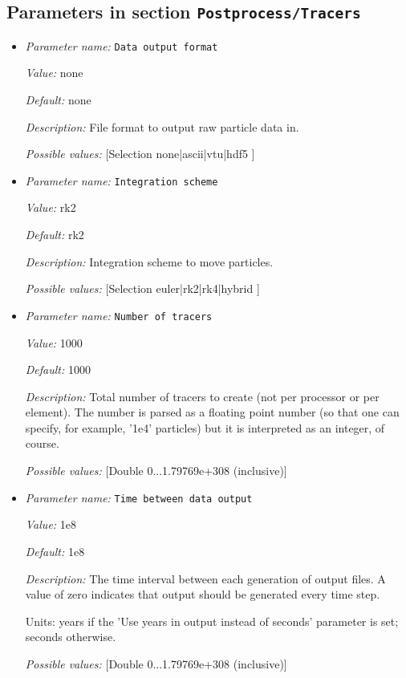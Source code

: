 \subsection{Parameters in section \tt Postprocess/Tracers}
\label{parameters:Postprocess/Tracers}

\begin{itemize}
\item {\it Parameter name:} {\tt Data output format}


{\it Value:} none


{\it Default:} none


{\it Description:} File format to output raw particle data in.


{\it Possible values:} [Selection none|ascii|vtu|hdf5 ]
\item {\it Parameter name:} {\tt Integration scheme}


{\it Value:} rk2


{\it Default:} rk2


{\it Description:} Integration scheme to move particles.


{\it Possible values:} [Selection euler|rk2|rk4|hybrid ]
\item {\it Parameter name:} {\tt Number of tracers}


{\it Value:} 1000


{\it Default:} 1000


{\it Description:} Total number of tracers to create (not per processor or per element). The number is parsed as a floating point number (so that one can specify, for example, '1e4' particles) but it is interpreted as an integer, of course.


{\it Possible values:} [Double 0...1.79769e+308 (inclusive)]
\item {\it Parameter name:} {\tt Time between data output}


{\it Value:} 1e8


{\it Default:} 1e8


{\it Description:} The time interval between each generation of output files. A value of zero indicates that output should be generated every time step.

Units: years if the 'Use years in output instead of seconds' parameter is set; seconds otherwise.


{\it Possible values:} [Double 0...1.79769e+308 (inclusive)]
\end{itemize}


